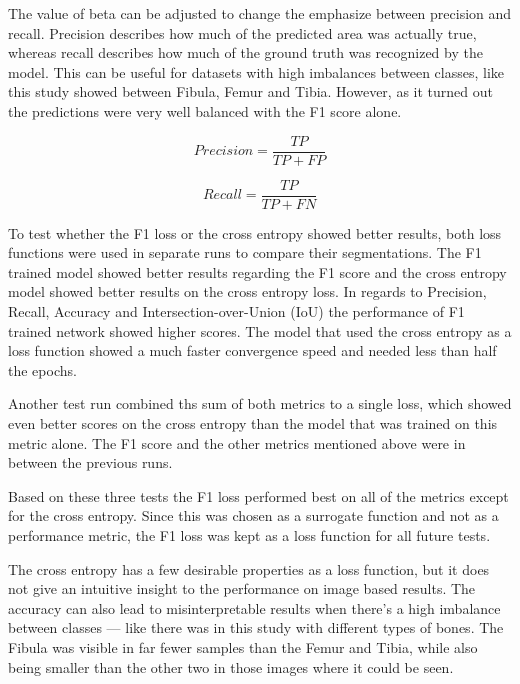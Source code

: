 The value of beta can be adjusted to change the emphasize between precision and recall. Precision describes how much of the predicted area was actually true, whereas recall describes how much of the ground truth was recognized by the model. This can be useful for datasets with high imbalances between classes, like this study showed between Fibula, Femur and Tibia. However, as it turned out the predictions were very well balanced with the F1 score alone.

\begin{equation}
Precision = \frac{TP}{TP+FP}
\end{equation}

\begin{equation}
Recall = \frac{TP}{TP+FN}
\end{equation}

To test whether the F1 loss or the cross entropy showed better results, both loss functions were used in separate runs to compare their segmentations. The F1 trained model showed better results regarding the F1 score and the cross entropy model showed better results on the cross entropy loss. In regards to Precision, Recall, Accuracy and Intersection-over-Union (IoU) the performance of F1 trained network showed higher scores. The model that used the cross entropy as a loss function showed a much faster convergence speed and needed less than half the epochs. 

Another test run combined ths sum of both metrics to a single loss, which showed even better scores on the cross entropy than the model that was trained on this metric alone. The F1 score and the other metrics mentioned above were in between the previous runs.

Based on these three tests the F1 loss performed best on all of the metrics except for the cross entropy. Since this was chosen as a surrogate function and not as a performance metric, the F1 loss was kept as a loss function for all future tests.

\iffalse

The cross entropy has a few desirable properties as a loss function, but it does not give an intuitive insight to the performance on image based results. The accuracy can also lead to misinterpretable results when there's a high imbalance between classes --- like there was in this study with different types of bones. The Fibula was visible in far fewer samples than the Femur and Tibia, while also being smaller than the other two in those images where it could be seen.

